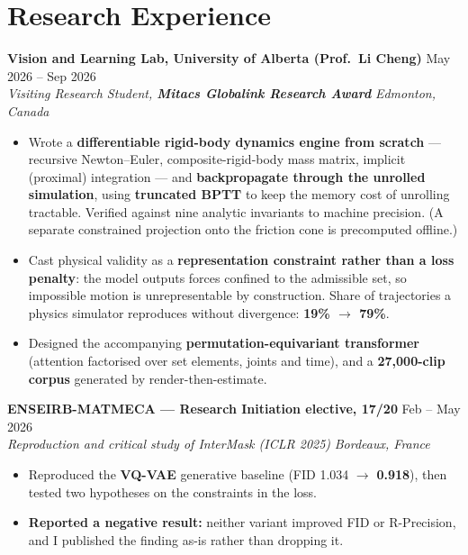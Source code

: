 \documentclass[10pt, letterpaper]{article}
\newcommand{\entry}[4]{%
  \noindent \textbf{#1} \hfill #2 \\
  \textit{#3} \hfill \textit{#4} \par
}
\begin{document}
\section{Research Experience}

\entry{Vision and Learning Lab, University of Alberta (Prof.\ Li Cheng)}{May 2026 -- Sep 2026}%
{Visiting Research Student, \textbf{Mitacs Globalink Research Award}}{Edmonton, Canada}
\begin{itemize}
    \item Wrote a \textbf{differentiable rigid-body dynamics engine from scratch} --- recursive Newton--Euler, composite-rigid-body mass matrix, implicit (proximal) integration --- and \textbf{backpropagate through the unrolled simulation}, using \textbf{truncated BPTT} to keep the memory cost of unrolling tractable. Verified against nine analytic invariants to machine precision. (A separate constrained projection onto the friction cone is precomputed offline.)
    \item Cast physical validity as a \textbf{representation constraint rather than a loss penalty}: the model outputs forces confined to the admissible set, so impossible motion is unrepresentable by construction. Share of trajectories a physics simulator reproduces without divergence: \textbf{19\% $\to$ 79\%}.
    \item Designed the accompanying \textbf{permutation-equivariant transformer} (attention factorised over set elements, joints and time), and a \textbf{27{,}000-clip corpus} generated by render-then-estimate.
\end{itemize}

\vspace{3pt}

\entry{ENSEIRB-MATMECA --- Research Initiation elective, 17/20}{Feb -- May 2026}%
{Reproduction and critical study of \textit{InterMask} (ICLR 2025)}{Bordeaux, France}
\begin{itemize}
    \item Reproduced the \textbf{VQ-VAE} generative baseline (FID 1.034 $\to$ \textbf{0.918}), then tested two hypotheses on the constraints in the loss.
    \item \textbf{Reported a negative result:} neither variant improved FID or R-Precision, and I published the finding as-is rather than dropping it.
\end{itemize}

\end{document}
